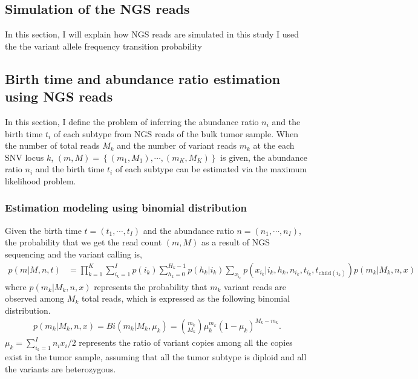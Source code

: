 \documentclass{article}
\begin{document}
\subsection{Simulation of the NGS reads}
In this section, I will explain how NGS reads are simulated in this study
I used the the variant allele frequency transition probability 

\subsection{Birth time and abundance ratio estimation using NGS reads}
In this section, I define the problem of inferring the abundance ratio $n_i$ and the birth time $t_i$ of each subtype from NGS reads of the bulk tumor sample.
When the number of total reads $M_k$ and the number of variant reads $m_k$ at the each SNV locus $k$, $(m, M) = \left\{(m_1, M_1), \cdots, (m_K, M_K) \right\}$ is given,
the abundance ratio $n_i$ and the birth time $t_i$ of each subtype can be estimated via the maximum likelihood problem.

\subsubsection{Estimation modeling using binomial distribution}
Given the birth time $t = (t_1, \cdots, t_I)$ and the abundance ratio $n = (n_1, \cdots, n_I)$, the probability that we get the read count $(m,M)$ as a result of NGS sequencing and the variant calling is,
\begin{align}
 p(m|M, n, t) & = \prod_{k=1}^{K} \sum_{i_k=1}^{I} p(i_k) \sum_{h_k=0}^{H_k-1} p(h_k | i_k) \sum_{x_{i_k}} p(x_{i_k} | i_k, h_k, n_{i_k}, t_{i_k}, t_{\mathrm{child}(i_k)}) p (m_k | M_k, n, x) \label{binom_estimation_model}
\end{align}
where $p (m_k | M_k, n, x)$ represents the probability that $m_k$ variant reads are observed among $M_k$ total reads, which is expressed as the following binomial distribution.
\begin{align}
 p (m_k | M_k, n, x) = Bi(m_k | M_k, \mu_k) = { m_k \choose M_k } \mu_k^{m_k} \left( 1 - \mu_k \right)^{M_k - m_k}.\label{param_estimation_binomial}
\end{align}
$\mu_k = \sum_{i_k = 1}^{I} n_i x_i / 2$ represents the ratio of variant copies among all the copies exist in the tumor sample, assuming that all the tumor subtype is diploid and all the variants are heterozygous.
\end{document}
